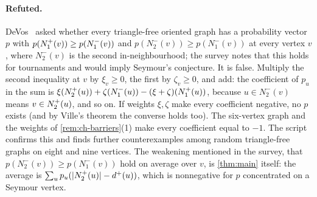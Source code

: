 \paragraph{Refuted.}
DeVos~\cite[Conjecture~6.28]{Sullivan2006} asked whether every triangle-free oriented
graph has a probability vector $p$ with $p(N^+_1(v))\ge p(N^-_1(v))$ and
$p(N^-_2(v))\ge p(N^-_1(v))$ at every vertex $v$, where $N^-_2(v)$ is the second
in-neighbourhood; the survey notes that this holds for tournaments and would imply
Seymour's conjecture. It is false. Multiply the second inequality at $v$ by $\xi_v\ge0$,
the first by $\zeta_v\ge0$, and add: the coefficient of $p_u$ in the sum is
$\xi(N^+_2(u))+\zeta(N^-_1(u))-(\xi+\zeta)(N^+_1(u))$, because $u\in N^-_2(v)$ means
$v\in N^+_2(u)$, and so on. If weights $\xi,\zeta$ make every coefficient negative, no
$p$ exists (and by Ville's theorem the converse holds too). The six-vertex graph and the
weights of \cref{rem:ch-barriers}(1) make every coefficient equal to $-1$. The script
confirms this and finds further counterexamples among random triangle-free graphs on
eight and nine vertices. The weakening mentioned in the survey, that
$p(N^-_2(v))\ge p(N^-_1(v))$ hold on average over $v$, is \cref{thm:main} itself: the
average is $\sum_up_u(\lvert N^+_2(u)\rvert-d^+(u))$, which is nonnegative for $p$
concentrated on a Seymour vertex.

